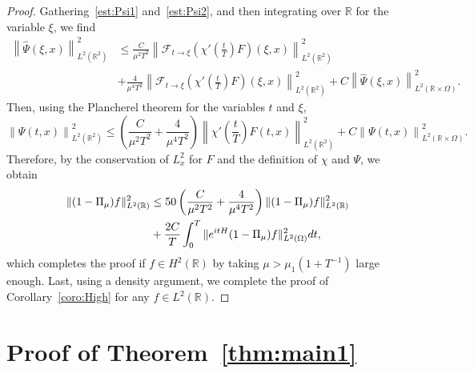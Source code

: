 \documentclass[a4paper,reqno]{amsart}
\theoremstyle{definition}
\numberwithin{equation}{section}
\newcommand{\R}{\mathbb{R}}
\def \R {{\mathbb{R} }}
\def \d {{\rm{d}}}
\begin{document}
\begin{proof}
        \smallskip
        Gathering~\eqref{est:Psi1} and~\eqref{est:Psi2}, and then integrating over $\R$ for the variable $\xi$, we find
        \begin{equation*}
        \begin{aligned}
            \left\|\widehat{\Psi}(\xi,x)\right\|^{2}_{L_{}^{2}(\R^{2})}
            &\le \frac{C}{\mu^2T^2}\left\|\mathcal{F}_{t\to \xi}\left({\chi'\left(\frac{t}{T}\right)F}\right)(\xi,x)\right\|_{L^{2}(\R^{2})}^{2}\\
            &+\frac{4}{\mu^{4}T^{2}}\left\|\mathcal{F}_{t\to \xi}\left({\chi'\left(\frac{t}{T}\right)F}\right)(\xi,x)\right\|_{L^{2}(\R^{2})}^{2}            
            +C\left\|\widehat{\Psi}(\xi,x)\right\|^{2}_{L^{2}(\R \times\Omega)}.
            \end{aligned}
            \end{equation*}
Then, using the Plancherel theorem for the variables $t$ and $\xi$, 
\begin{equation*}
    \left\|\Psi(t,x)\right\|_{L^{2}(\R^{2})}^{2}\le 
    \left(\frac{C}{\mu^2T^2}+\frac{4}{\mu^{4}T^{2}}\right)\left\|\chi'\left(\frac{t}{T}\right)F(t,x)\right\|_{L^{2}(\R^{2})}^{2}+  
    C\left\|\Psi(t,x)\right\|_{L^{2}(\R\times \Omega)}^{2}.  
    \end{equation*}
    Therefore, by the conservation of $L_{x}^{2}$ for $F$ and the definition of $\chi$ and $\Psi$, we obtain
    \begin{equation*}
    \begin{aligned}
        \|(1-\Pi_{\mu})f\|_{L^{2}(\R)}^{2}
        &\le 50\left(\frac{C}{\mu^2T^2}+\frac{4}{\mu^{4}T^{2}}\right)\|(1-\Pi_{\mu})f\|_{L^{2}(\R)}^{2}\\
        &+\frac{2C}{T}\int_{0}^{T}\|e^{itH}(1-\Pi_{\mu})f\|_{L^{2}(\Omega)}^{2}\d t,
        \end{aligned}
        \end{equation*}
        which completes the proof if $f\in H^{2}(\R)$ by taking $\mu>\mu_1(1+T^{-1})$ large enough. Last, using a density argument, we complete the proof of Corollary~\ref{coro:High} for any $f\in L^{2}(\R)$.
\end{proof}

\section{Proof of Theorem~\ref{thm:main1}}\label{SS:MAIN}
\end{document}
